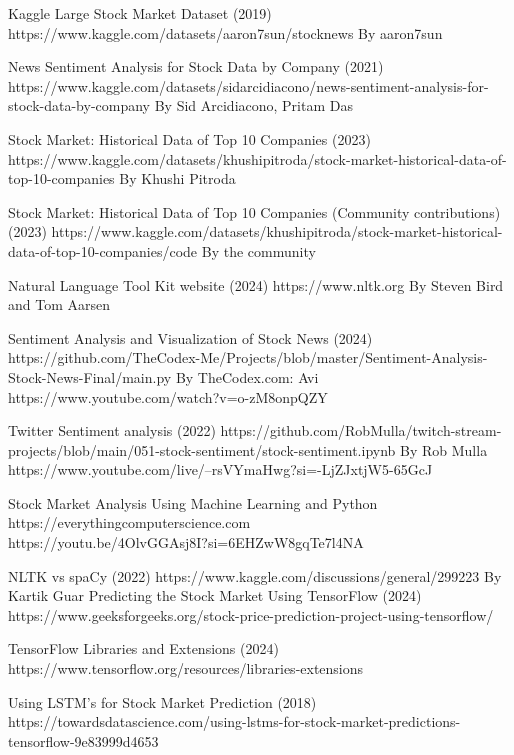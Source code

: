 \documentclass[11pt, a4paper]{article}
\begin{document}
\newpage
\begin{thebibliography}{9}

Kaggle Large Stock Market Dataset (2019)
https://www.kaggle.com/datasets/aaron7sun/stocknews
By aaron7sun


News Sentiment Analysis for Stock Data by Company (2021)
https://www.kaggle.com/datasets/sidarcidiacono/news-sentiment-analysis-for-stock-data-by-company
By Sid Arcidiacono, Pritam Das

Stock Market: Historical Data of Top 10 Companies (2023)
https://www.kaggle.com/datasets/khushipitroda/stock-market-historical-data-of-top-10-companies
By Khushi Pitroda 

Stock Market: Historical Data of Top 10 Companies (Community contributions) (2023)
https://www.kaggle.com/datasets/khushipitroda/stock-market-historical-data-of-top-10-companies/code
By the community

Natural Language Tool Kit website (2024)
https://www.nltk.org
By Steven Bird and Tom Aarsen

Sentiment Analysis and Visualization of Stock News (2024)
https://github.com/TheCodex-Me/Projects/blob/master/Sentiment-Analysis-Stock-News-Final/main.py
By TheCodex.com: Avi
https://www.youtube.com/watch?v=o-zM8onpQZY

Twitter Sentiment analysis (2022)
https://github.com/RobMulla/twitch-stream-projects/blob/main/051-stock-sentiment/stock-sentiment.ipynb
By Rob Mulla
https://www.youtube.com/live/--rsVYmaHwg?si=-LjZJxtjW5-65GcJ

Stock Market Analysis Using Machine Learning and Python
\\https://everythingcomputerscience.com
\\https://youtu.be/4OlvGGAsj8I?si=6EHZwW8gqTe7l4NA


NLTK vs spaCy  (2022)
https://www.kaggle.com/discussions/general/299223
By Kartik Guar
Predicting the Stock Market Using TensorFlow (2024)
https://www.geeksforgeeks.org/stock-price-prediction-project-using-tensorflow/

TensorFlow Libraries and Extensions (2024)
https://www.tensorflow.org/resources/libraries-extensions

Using LSTM's for Stock Market Prediction (2018)
https://towardsdatascience.com/using-lstms-for-stock-market-predictions-tensorflow-9e83999d4653


\end{thebibliography}
\end{document}
